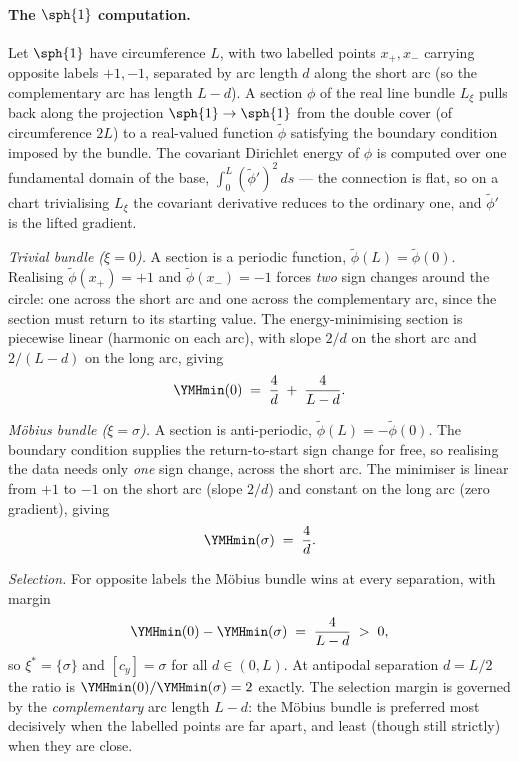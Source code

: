 \paragraph{The $\sph{1}$ computation.} Let $\sph{1}$ have
circumference $L$, with two labelled points $x_+,x_-$ carrying
opposite labels $+1,-1$, separated by arc length $d$ along the short
arc (so the complementary arc has length $L-d$). A section
$\phi$ of the real line bundle $L_\xi$ pulls back along the
projection $\sph{1}\to\sph{1}$ from the double cover (of circumference
$2L$) to a real-valued function $\tilde\phi$ satisfying the
boundary condition imposed by the bundle. The covariant Dirichlet
energy of $\phi$ is computed over one fundamental domain of the
base, $\int_0^L(\tilde\phi')^2\,ds$ --- the connection is flat, so on
a chart trivialising $L_\xi$ the covariant derivative reduces to the
ordinary one, and $\tilde\phi'$ is the lifted gradient.

\emph{Trivial bundle ($\xi=0$).} A section is a periodic function,
$\tilde\phi(L)=\tilde\phi(0)$. Realising $\tilde\phi(x_+)=+1$ and
$\tilde\phi(x_-)=-1$ forces \emph{two} sign changes around the
circle: one across the short arc and one across the complementary
arc, since the section must return to its starting value. The
energy-minimising section is piecewise linear (harmonic on each arc),
with slope $2/d$ on the short arc and $2/(L-d)$ on the long arc,
giving
\[
   \YMHmin(0) \;=\; \frac{4}{d} \;+\; \frac{4}{L-d}.
\]

\emph{M\"obius bundle ($\xi=\sigma$).} A section is anti-periodic,
$\tilde\phi(L)=-\tilde\phi(0)$. The boundary condition supplies the
return-to-start sign change for free, so realising the data needs
only \emph{one} sign change, across the short arc. The minimiser is
linear from $+1$ to $-1$ on the short arc (slope $2/d$) and constant
on the long arc (zero gradient), giving
\[
   \YMHmin(\sigma) \;=\; \frac{4}{d}.
\]

\emph{Selection.} For opposite labels the M\"obius bundle wins at
every separation, with margin
\[
   \YMHmin(0)-\YMHmin(\sigma) \;=\; \frac{4}{L-d} \;>\; 0,
\]
so $\xi^*=\{\sigma\}$ and $[c_y]=\sigma$ for all $d\in(0,L)$. At
antipodal separation $d=L/2$ the ratio is
$\YMHmin(0)/\YMHmin(\sigma)=2$ exactly. The selection margin is
governed by the \emph{complementary} arc length $L-d$: the M\"obius
bundle is preferred most decisively when the labelled points are far
apart, and least (though still strictly) when they are close.


